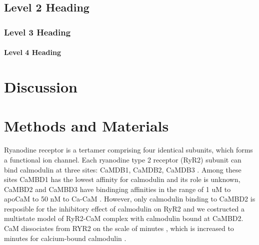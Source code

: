 \documentclass[9pt,lineno]{elife}
\begin{document}



\subsection{Level 2 Heading}



\subsubsection{Level 3 Heading}



\paragraph{Level 4 Heading}


\section{Discussion}



\section{Methods and Materials}

Ryanodine receptor is a tertamer comprising four identical subunits, which forms a functional ion channel. Each ryanodine type 2 receptor (RyR2) subunit can bind calmodulin at three sites: CaMDB1, CaMDB2, CaMDB3 \citep{3_sites_ryr3cam}. Among these sites CaMBD1 has the lowest affinity for calmodulin \cite{3_sites_ryr3cam,ryrcam_sites_affinities} and its role is unknown, CaMBD2 and CaMBD3 have bindinging affinities in the range  of 1 uM to apoCaM to 50 nM to Ca-CaM \citep{3_sites_ryr3cam, low_threshold_soicrCaMBD1,xu_meissner_2004}. However, only calmodulin binding to CaMBD2 is resposible for the inhibitory effect of calmodulin on RyR2 \citep{YAMAGUCHI200323480,low_threshold_soicrCaMBD1} and we costructed a multistate model of RyR2-CaM complex with calmodulin bound at CaMBD2. CaM dissociates from RYR2 on the scale of minutes \citep{BALSHAW200120144}, which is increased to minutes for calcium-bound calmodulin \citep{BALSHAW200120144, ryrcam_dissociation_rate}.
\end{document}
